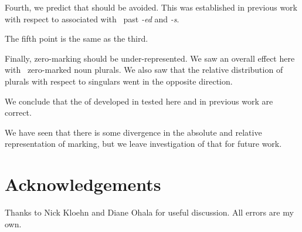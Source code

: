 \documentclass[output=paper,
modfonts
]{LSP/langsci}
\begin{document}
Fourth, we predict that  should be avoided. This was established in previous work with respect to  associated with \e\ past \emph{-ed} and  \emph{-s}.

The fifth point is the same as the third.

Finally, zero-marking should be under-represented. We saw an overall effect here with \e\ zero-marked noun plurals. We also saw that the relative distribution of plurals with respect to singulars went in the opposite direction.

We conclude that the  of  developed in \citet{dimensions} tested here and in previous work are correct.

We have seen that there is some divergence in the absolute and relative representation of  marking, but we leave investigation of that for future work.

\section*{Acknowledgements}

Thanks to Nick Kloehn and Diane Ohala for useful discussion. All errors are my own.

\printbibliography[heading=subbibliography,notkeyword=this]
\end{document}
